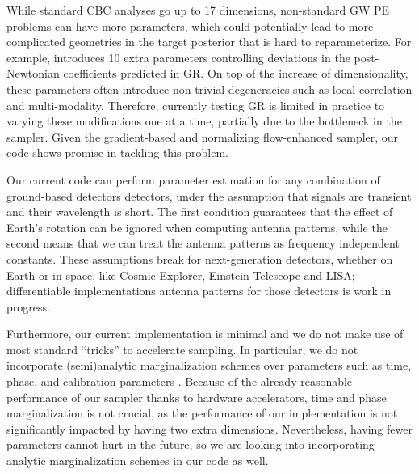 \documentclass[twocolumn]{aastex631}
\begin{document}
While standard CBC analyses go up to 17 dimensions, non-standard GW PE problems
can have more parameters, which could potentially lead to more complicated
geometries in the target posterior that is hard to reparameterize. For example,
\cite{LIGOScientific:2021sio} introduces 10 extra parameters controlling
deviations in the post-Newtonian coefficients predicted in GR. On top of the
increase of dimensionality, these parameters often introduce non-trivial
degeneracies such as local correlation and multi-modality. Therefore, currently
testing GR is limited in practice to varying these modifications one at a time,
partially due to the bottleneck in the sampler.  Given the gradient-based and
normalizing flow-enhanced sampler, our code shows promise in tackling this
problem.

Our current code can perform parameter estimation for any combination of
ground-based detectors detectors, under the assumption that signals are
transient and their wavelength is short. The first condition guarantees that
the effect of Earth's rotation can be ignored when computing antenna patterns,
while the second means that we can treat the antenna patterns as frequency
independent constants. These assumptions break for next-generation detectors,
whether on Earth or in space, like Cosmic Explorer, Einstein Telescope and
LISA; differentiable implementations antenna patterns for those detectors is
work in progress.

Furthermore, our current implementation is minimal and we do not make use of
most standard ``tricks'' to accelerate sampling.  In particular, we do not
incorporate (semi)analytic marginalization schemes over parameters such as
time, phase, and calibration parameters \cite{2019PASA...36...10T}. Because of
the already reasonable performance of our sampler thanks to hardware
accelerators, time and phase marginalization is not crucial, as the performance
of our implementation is not significantly impacted by having two extra
dimensions. Nevertheless, having fewer parameters cannot hurt in the future, so
we are looking into incorporating analytic marginalization schemes in our code
as well.
\end{document}
